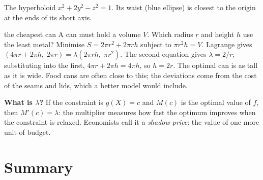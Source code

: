 \begin{center}

{\small\color{navy} The hyperboloid $x^2+2y^2-z^2=1$. Its waist (blue ellipse) is closest to the
origin at the ends of its short axis.}
\end{center}

\begin{reallife}{the cheapest can}
A can must hold a volume $V$. Which radius $r$ and height $h$ use the least metal? Minimise
$S=2\pi r^2+2\pi rh$ subject to $\pi r^2h=V$. Lagrange gives
$(4\pi r+2\pi h,\;2\pi r)=\lambda(2\pi rh,\;\pi r^2)$. The second equation gives
$\lambda=2/r$; substituting into the first, $4\pi r+2\pi h=4\pi h$, so $h=2r$. The optimal can is
as tall as it is wide. Food cans are often close to this; the deviations come from the cost of
the seams and lids, which a better model would include.
\end{reallife}

\begin{extra}
\textbf{What is $\lambda$?} If the constraint is $g(X)=c$ and $M(c)$ is the optimal value of $f$,
then $M'(c)=\lambda$: the multiplier measures how fast the optimum improves when the constraint is
relaxed. Economists call it a \emph{shadow price}: the value of one more unit of budget.
\end{extra}

\section{Summary}

